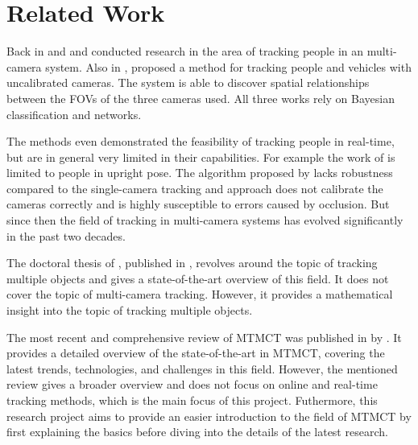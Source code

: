 \section{Related Work}\label{sec:related_work}
Back in \citeyear{Cai99} and \citeyear{Chang01} \textcite{Cai99} and \textcite{Chang01} conducted research in the area of tracking people in an multi-camera system. Also in \citeyear{Khan01}, \textcite{Khan01} proposed a method for tracking people and vehicles with uncalibrated cameras. The system is able to discover spatial relationships between the FOVs of the three cameras used. All three works rely on Bayesian classification and networks. %

The methods even demonstrated the feasibility of tracking people in real-time, but are in general very limited in their capabilities. For example the work of \citeauthor{Chang01} is limited to people in upright pose. The algorithm proposed by \citeauthor{Cai99} lacks robustness compared to the single-camera tracking and \citeauthor{Khan01} approach does not calibrate the cameras correctly and is highly susceptible to errors caused by occlusion. But since then the field of tracking in multi-camera systems has evolved significantly in the past two decades.

The doctoral thesis of \textcite[Chapter 5]{Tian19}, published in \citeyear{Tian19}, revolves around the topic of tracking multiple objects and gives a state-of-the-art overview of this field. It does not cover the topic of multi-camera tracking. However, it provides a mathematical insight into the topic of tracking multiple objects.

The most recent and comprehensive review of MTMCT was published in \citeyear{Amosa23} by \textcite{Amosa23}. It provides a detailed overview of the state-of-the-art in MTMCT, covering the latest trends, technologies, and challenges in this field. However, the mentioned review gives a broader overview and does not focus on online and real-time tracking methods, which is the main focus of this project. Futhermore, this research project aims to provide an easier introduction to the field of MTMCT by first explaining the basics before diving into the details of the latest research.